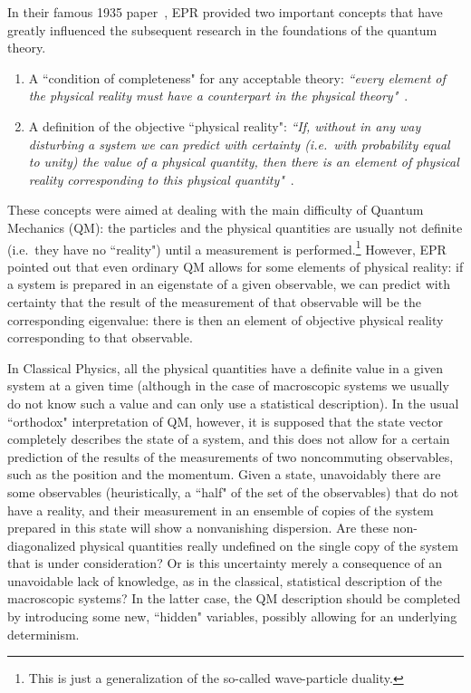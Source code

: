 \documentclass[published]{JHEP3}
\begin{document}
In their famous 1935 paper~\cite{EPR}, EPR provided two important
concepts that have greatly influenced the subsequent research in the
foundations of the quantum theory.
{\renewcommand{\theenumi}{\Roman{enumi}}
\begin{enumerate}   
\item A ``condition of completeness" for any acceptable theory: {\it
``every element of the physical reality must have a counterpart in
the physical theory"}~\cite{EPR}.

\item A definition of the objective ``physical reality": \emph{``If,
without in any way disturbing a system we can predict with
certainty (i.e.\ with probability equal to unity) the value of a
physical quantity, then there is an element of physical reality
corresponding to this physical quantity"}~\cite{EPR}.
\end{enumerate}}

These concepts were aimed at dealing with the main difficulty of
Quantum Mechanics (QM): the particles and the physical quantities are
usually not definite (i.e.\ they have no ``reality") until a
measurement is performed.\footnote{This is just a generalization of
the so-called wave-particle duality.} However, EPR pointed out that
even ordinary QM allows for some elements of physical reality: if a
system is prepared in an eigenstate of a given observable, we can
predict with certainty that the result of the measurement of that
observable will be the corresponding eigenvalue: there is then an
element of objective physical reality corresponding to that
observable.

In Classical Physics, all the physical quantities have a definite
value in a given system at a given time (although in the case of
macroscopic systems we usually do not know such a value and can only
use a statistical description). In the usual ``orthodox"
interpretation of QM, however, it is supposed that the state vector
completely describes the state of a system, and this does not allow
for a certain prediction of the results of the measurements of two
noncommuting observables, such as the position and the momentum. Given
a state, unavoidably there are some observables (heuristically, a
``half" of the set of the observables) that do not have a reality, and
their measurement in an ensemble of copies of the system prepared in
this state will show a nonvanishing dispersion. Are these
non-diagonalized physical quantities really undefined on the single
copy of the system that is under consideration? Or is this uncertainty
merely a consequence of an unavoidable lack of knowledge, as in the
classical, statistical description of the macroscopic systems? In the
latter case, the QM description should be completed by introducing
some new, ``hidden" variables, possibly allowing for an underlying
determinism.
\end{document}
